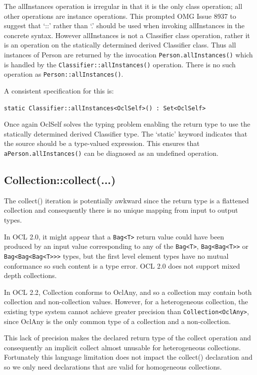 \documentclass{eceasst}
\begin{document}
The allInstances operation is irregular in that it is the only class operation; all other operations are instance operations. This prompted OMG Issue 8937\cite{OMG-Issue-8937} to suggest that `::' rather than `.' should be used when invoking allInstances in the concrete syntax. However allInstances is not a Classifier class operation, rather it is an operation on the statically determined derived Classifier class. Thus all instances of Person are returned by the invocation  \verb!Person.allInstances()! which is handled by the  \verb!Classifier::allInstances()! operation. There is no such operation as \verb!Person::allInstances()!. 

A consistent specification for this is:

\verb!static Classifier::allInstances<OclSelf>() : Set<OclSelf>!

Once again OclSelf solves the typing problem enabling the return type to use the statically determined derived Classifier type. The `static' keyword indicates that the source should be a type-valued expression. This ensures that  \verb!aPerson.allInstances()! can be diagnosed as an undefined operation.

\subsection{Collection::collect(...)}

The collect() iteration is potentially awkward since the return type is a flattened collection and consequently there is no unique mapping from input to output types. 

In OCL 2.0, it might appear that a \verb!Bag<T>! return value could have been produced by an input value corresponding to any of the \verb!Bag<T>!, \verb!Bag<Bag<T>>! or \verb!Bag<Bag<Bag<T>>>! types, but the first level element types have no mutual conformance so such content is a type error. OCL 2.0 does not support mixed depth collections.

In OCL 2.2, Collection conforms to OclAny, and so a collection may contain both collection and non-collection values. However,  for a heterogeneous collection, the existing type system cannot achieve greater precision than  \verb!Collection<OclAny>!, since OclAny is the only common type of a collection and a non-collection.

This lack of precision makes the declared return type of the collect operation and consequently an implicit collect almost unusable for heterogeneous collections. Fortunately this language limitation does not impact the collect() declaration and so  we only need declarations that are valid for homogeneous collections.
\end{document}
